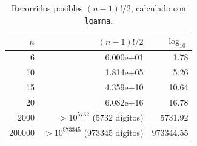 \begin{table}[H]\centering
\caption{Recorridos posibles $(n-1)!/2$, calculado con \texttt{lgamma}.}
\label{tab:factorial}
\begin{tabular}{|r|r|r|}\toprule
\rowcolor{gray!25}
\textbf{$n$} & \textbf{$(n-1)!/2$} & \textbf{$\log_{10}$} \\\midrule
6 & 6.000e+01 & 1.78 \\
10 & 1.814e+05 & 5.26 \\
15 & 4.359e+10 & 10.64 \\
20 & 6.082e+16 & 16.78 \\
2000 & $>10^{5732}$ (5732 dígitos) & 5731.92 \\
200000 & $>10^{973345}$ (973345 dígitos) & 973344.55 \\
\bottomrule\end{tabular}\end{table}
